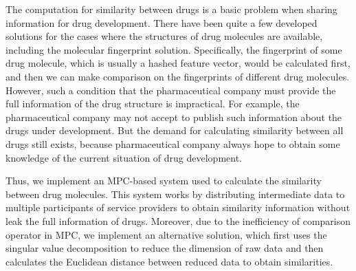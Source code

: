 
\begin{eabstract}
	The computation for similarity between drugs is a basic problem when sharing information for drug development. There have been quite a few developed solutions for the cases where the structures of drug molecules are available, including the molecular fingerprint solution. Specifically, the fingerprint of some drug molecule, which is usually a hashed feature vector, would be calculated first, and then we can make comparison on the fingerprints of different drug molecules. However, such a condition that the pharmaceutical company must provide the full information of the drug structure is impractical. For example, the pharmaceutical company may not accept to publish such information about the drugs under development. But the demand for calculating similarity between all drugs still exists, because pharmaceutical company always hope to obtain some knowledge of the current situation of drug development.
	
	Thus, we implement an MPC-based system used to calculate the similarity between drug molecules. This system works by distributing intermediate data to multiple participants of service providers to obtain similarity information without leak the full information of drugs. Moreover, due to the inefficiency of comparison operator in MPC, we implement an alternative solution, which first uses the singular value decomposition to reduce the dimension of raw data and then calculates the Euclidean distance between reduced data to obtain similarities.
\end{eabstract}

